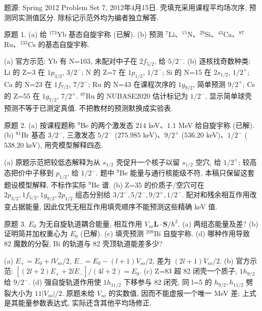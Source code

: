 题源: Spring 2012 Problem Set 7, 2012年4月15日. 壳填充采用课程平均场次序, 预测同实测值区分. 除标记示范外均为编者独立解答.
\begin{exercise}\label{ex:2202-7-1}
原题 1. (a) 给 $^{173}$Yb 基态自旋宇称 (已解). (b) 预测 $^7$Li、$^{15}$N、$^{29}$Si、$^{43}$Ca、$^{87}$Ru、$^{133}$Cs 的基态自旋宇称.
\end{exercise}
\begin{solution}
(a) 官方示范: Yb 有 N=103, 未配对中子在 $2f_{5/2}$, 给 $5/2^-$. (b) 逐核找奇数种类: Li 的 Z=3 在 $1p_{3/2}$, $3/2^-$; N 的 Z=7 在 $1p_{1/2}$, $1/2^-$; Si 的 N=15 在 $2s_{1/2}$, $1/2^+$; Ca 的 N=23 在 $1f_{7/2}$, $7/2^-$; Ru 的 N=43 在课程次序的 $1g_{9/2}$, 简单预测 $9/2^+$; Cs 的 Z=55 在 $1g_{7/2}$, $7/2^+$. $^{87}$Ru 的 NUBASE2020 估计标记为 $1/2^-$, 显示简单球壳预测不等于已测定真值. 不把教材的预测默换成实验表.
\end{solution}
\begin{exercise}\label{ex:2202-7-2}
原题 2. (a) 按课程题称 $^9$Be 的两个激发态 $214$ keV、$1.1$ MeV 给自旋宇称 (已解). (b) $^{81}$Br 基态 $3/2^-$, 三激发态 $5/2^-$ ($275.985$ keV)、$9/2^+$ ($536.20$ keV)、$1/2^-$ ($538.20$ keV), 用壳模型解释四态.
\end{exercise}
\begin{solution}
(a) 原题示范把较低态解释为从 $s_{1/2}$ 壳促升一个核子以留 $s_{1/2}$ 空穴, 给 $1/2^+$; 较高态把价中子移到 $p_{1/2}$, 给 $1/2^-$. 题中 $^9$Be 能量与通行核能级不符, 本稿只保留这套题设模型解释, 不标作实际 $^9$Be 谱. (b) Z=35 的价质子/空穴可在 $2p_{3/2},1f_{5/2},1g_{9/2},2p_{1/2}$ 组态分别给 $3/2^-,5/2^-,9/2^+,1/2^-$. 配对和残余相互作用改变占据能量, 因此仅凭无相互作用填壳顺序不能预测这些精确 keV 值.
\end{solution}
\begin{exercise}\label{ex:2202-7-3}
原题 3. $E_0$ 为无自旋轨道耦合能量, 相互作用 $V_{so}\mathbf L\cdot\mathbf S/\hbar^2$. (a) 两组态能量及差? (b) 证明简并加权重心为 $E_0$ (已解). (c) 填壳预测 $^{209}$Bi 自旋宇称. (d) 哪种作用导致 82 魔数的分裂, Bi 的轨道与 82 壳顶轨道能差多少?
\end{exercise}
\begin{solution}
(a) $E_+=E_0+lV_{so}/2$, $E_-=E_0-(l+1)V_{so}/2$, 差为 $(2l+1)V_{so}/2$. (b) 官方示范: $[(2l+2)E_++2lE_-]/(4l+2)=E_0$. (c) Z=83 超 82 闭壳一个质子, $1h_{9/2}$ 给 $9/2^-$. (d) 强自旋轨道作用使 $1h_{11/2}$ 下移参与 82 闭壳, 同 l=5 的 $h_{9/2},h_{11/2}$ 劈裂大小为 $11|V_{so}|/2$. 原题未给 $V_{so}$ 的实数值, 因而不能虚报一个唯一 MeV 差; 上式是其能量参数表达式, 实际还含其他平均场修正.
\end{solution}
